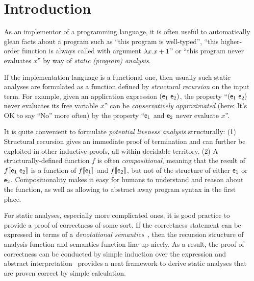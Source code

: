 \section{Introduction}
\label{sec:introduction}

As an implementor of a programming language, it is often useful to automatically
glean facts about a program such as ``this program is well-typed'', ``this
higher-order function is always called with argument $\lambda x. x+1$'' or ``this
program never evaluates $x$'' by way of \emph{static (program) analysis}.

If the implementation language is a functional one, then usually such static
analyses are formulated as a function defined by \emph{structural recursion} on
the input term.
For example, given an application expression $(\mathsf{e}_1~\mathsf{e}_2)$,
the property ``$(\mathsf{e}_1~\mathsf{e}_2)$ never evaluates its free variable $x$'' can be
\emph{conservatively approximated} (here: It's OK to say ``No'' more often) by
the property ``$\mathsf{e}_1$ and $\mathsf{e}_2$ never evaluate $x$''.

It is quite convenient to formulate \emph{potential liveness analysis}
structurally:
(1) Structural recursion gives an immediate proof of termination and can
    further be exploited in other inductive proofs, all within decidable
    territory.
(2) A structurally-defined function $f$ is often \emph{compositional}, meaning that
    the result of $f\llbracket {\mathsf{e}_1~\mathsf{e}_2} \rrbracket$ is a function of $f\llbracket {\mathsf{e}_1} \rrbracket$ and
    $f\llbracket {\mathsf{e}_2} \rrbracket$, but not of the structure of either $\mathsf{e}_1$ or $\mathsf{e}_2$.
    Compositionality makes it easy for humans to understand and reason about the
    function, as well as allowing to abstract away program syntax in the first
    place.

For static analyses, especially more complicated ones, it is good practice to
provide a proof of correctness of some sort. If the correctness statement can
be expressed in terms of a \emph{denotational
semantics}~\cite{ScottStrachey:71}, then the recursion structure of analysis
function and semantics function line up nicely. As a result, the proof of
correctness can be conducted by simple induction over the expression and
abstract interpretation~\cite{Cousot:21} provides a neat framework to derive
static analyses that are proven correct by simple calculation.


